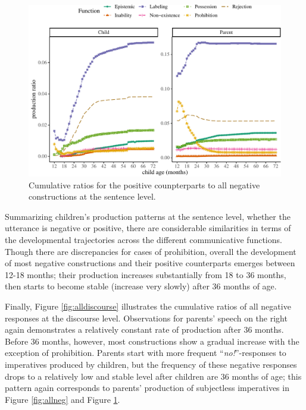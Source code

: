 \documentclass[
  man,floatsintext]{apa6}
\begin{document}
\begin{figure}[H]

{\centering \includegraphics{neg_construction_article_files/figure-latex/allpos-1} 

}

\caption{Cumulative ratios for the positive counpterparts to all negative constructions at the sentence level.}\label{fig:allpos}
\end{figure}

Summarizing children's production patterns at the sentence level, whether the utterance is negative or positive, there are considerable similarities in terms of the developmental trajectories across the different communicative functions. Though there are discrepancies for cases of prohibition, overall the development of most negative constructions and their positive counterparts emerges between 12-18 months; their production increases substantially from 18 to 36 months, then starts to become stable (increase very slowly) after 36 months of age.

Finally, Figure \ref{fig:alldiscourse} illustrates the cumulative ratios of all negative responses at the discourse level. Observations for parents' speech on the right again demonstrates a relatively constant rate of production after 36 months. Before 36 months, however, most constructions show a gradual increase with the exception of prohibition. Parents start with more frequent ``\emph{no!}''-responses to imperatives produced by children, but the frequency of these negative responses drops to a relatively low and stable level after children are 36 months of age; this pattern again corresponds to parents' production of subjectless imperatives in Figure \ref{fig:allneg} and Figure \ref{fig:allpos}.
\end{document}
